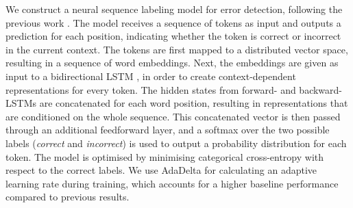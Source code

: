 \documentclass[11pt,letterpaper]{article}
\begin{document}
We construct a neural sequence labeling model for error detection, following the previous work \cite{Rei2016,Rei2017}. %
The model receives a sequence of tokens
as input and outputs a prediction for each position, indicating whether the token is correct or incorrect in the current context.
The tokens are first mapped to a distributed vector space, resulting in a sequence of word embeddings. %
Next, the embeddings are given as input to a bidirectional LSTM \cite{Hochreiter1997}, in order to create context-dependent representations for every token.
The  hidden states from forward- and backward-LSTMs are concatenated for each word position, resulting in representations that are conditioned on the whole sequence. %
This concatenated vector is then passed through an additional feedforward layer, and a softmax over the two possible labels (\textit{correct} and \textit{incorrect}) is used to output a probability distribution for each token.
The model is optimised by minimising categorical cross-entropy with respect to the correct labels.
We use AdaDelta \cite{Zeiler2012} for calculating an adaptive learning rate during training, which accounts for a higher baseline performance compared to previous results.

\end{document}
